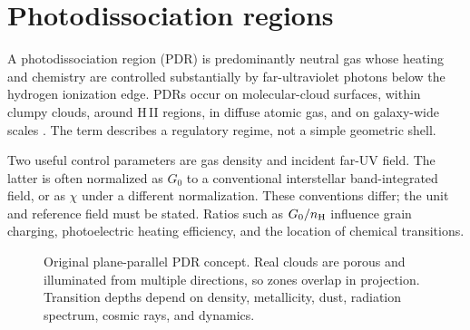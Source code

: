 \section{Photodissociation regions}

A photodissociation region (PDR) is predominantly neutral gas whose heating and
chemistry are controlled substantially by far-ultraviolet photons below the hydrogen
ionization edge.  PDRs occur on molecular-cloud surfaces, within clumpy clouds, around
H\,II regions, in diffuse atomic gas, and on galaxy-wide scales
\citep{HollenbachTielens1999}.  The term describes a regulatory regime, not a simple
geometric shell.

Two useful control parameters are gas density and incident far-UV field.  The latter
is often normalized as $G_0$ to a conventional interstellar band-integrated field, or
as $\chi$ under a different normalization.  These conventions differ; the unit and
reference field must be stated.  Ratios such as $G_0/n_{\rm H}$ influence grain
charging, photoelectric heating efficiency, and the location of chemical transitions.

\begin{figure}[tbp]
\centering
{}
\caption{Original plane-parallel PDR concept.  Real clouds are porous and illuminated
from multiple directions, so zones overlap in projection.  Transition depths depend
on density, metallicity, dust, radiation spectrum, cosmic rays, and dynamics.}
\label{fig:pdr-layering}
\end{figure}

